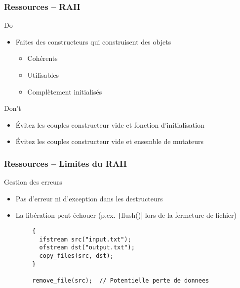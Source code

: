\documentclass[C++.tex]{subfiles}
\begin{document}
\begin{frame}[fragile]
	\frametitle{Ressources -- RAII}
	\begin{exampleblock}{Do}
		\begin{itemize}
			\item Faites des constructeurs qui construisent des objets
			\begin{itemize}
				\item Cohérents
				\item Utilisables
				\item Complètement initialisés
			\end{itemize}
		\end{itemize}
	\end{exampleblock}

	\begin{alertblock}{Don't}
		\begin{itemize}
			\item Évitez les couples constructeur vide et fonction d'initialisation
			\item Évitez les couples constructeur vide et ensemble de mutateurs
		\end{itemize}
	\end{alertblock}
\end{frame}

\begin{frame}[fragile]
	\frametitle{Ressources -- Limites du RAII}
	\begin{alertblock}{Gestion des erreurs}
		\begin{itemize}
			\item Pas d'erreur ni d'exception dans les destructeurs
			\item La libération peut échouer (p.ex. \texttt|flush()| lors de la fermeture de fichier)
		\end{itemize}
	\end{alertblock}

	\begin{verbatim}
		{
		  ifstream src("input.txt");
		  ofstream dst("output.txt");
		  copy_files(src, dst);
		}

		remove_file(src);  // Potentielle perte de donnees
	\end{verbatim}

\end{frame}
\end{document}
